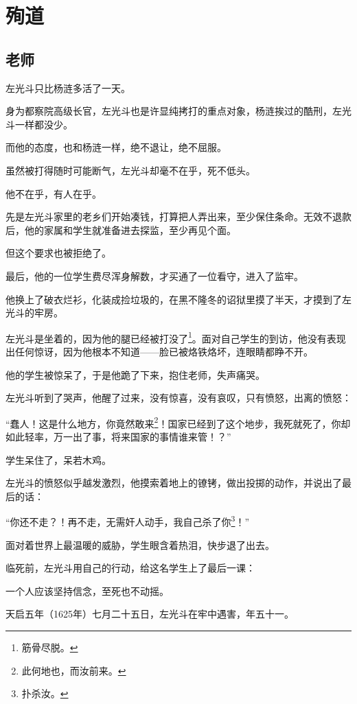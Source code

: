 \section{殉道}
\ifnum{}
	\begin{multicols}{\theparacolNo}
		\fi
		\subsection{老师}
		左光斗只比杨涟多活了一天。

		身为都察院高级长官，左光斗也是许显纯拷打的重点对象，杨涟挨过的酷刑，左光斗一样都没少。

		而他的态度，也和杨涟一样，绝不退让，绝不屈服。

		虽然被打得随时可能断气，左光斗却毫不在乎，死不低头。

		他不在乎，有人在乎。

		先是左光斗家里的老乡们开始凑钱，打算把人弄出来，至少保住条命。无效不退款后，他的家属和学生就准备进去探监，至少再见个面。

		但这个要求也被拒绝了。

		最后，他的一位学生费尽浑身解数，才买通了一位看守，进入了监牢。

		他换上了破衣烂衫，化装成捡垃圾的，在黑不隆冬的诏狱里摸了半天，才摸到了左光斗的牢房。

		左光斗是坐着的，因为他的腿已经被打没了\footnote{筋骨尽脱。}。面对自己学生的到访，他没有表现出任何惊讶，因为他根本不知道——脸已被烙铁烙坏，连眼睛都睁不开。

		他的学生被惊呆了，于是他跪了下来，抱住老师，失声痛哭。

		左光斗听到了哭声，他醒了过来，没有惊喜，没有哀叹，只有愤怒，出离的愤怒：

		“蠢人！这是什么地方，你竟然敢来\footnote{此何地也，而汝前来。}！国家已经到了这个地步，我死就死了，你却如此轻率，万一出了事，将来国家的事情谁来管！？”

		学生呆住了，呆若木鸡。

		左光斗的愤怒似乎越发激烈，他摸索着地上的镣铐，做出投掷的动作，并说出了最后的话：

		“你还不走？！再不走，无需奸人动手，我自己杀了你\footnote{扑杀汝。}！”

		面对着世界上最温暖的威胁，学生眼含着热泪，快步退了出去。

		临死前，左光斗用自己的行动，给这名学生上了最后一课：

		一个人应该坚持信念，至死也不动摇。

		天启五年（1625年）七月二十五日，左光斗在牢中遇害，年五十一。


\end{multicols}
